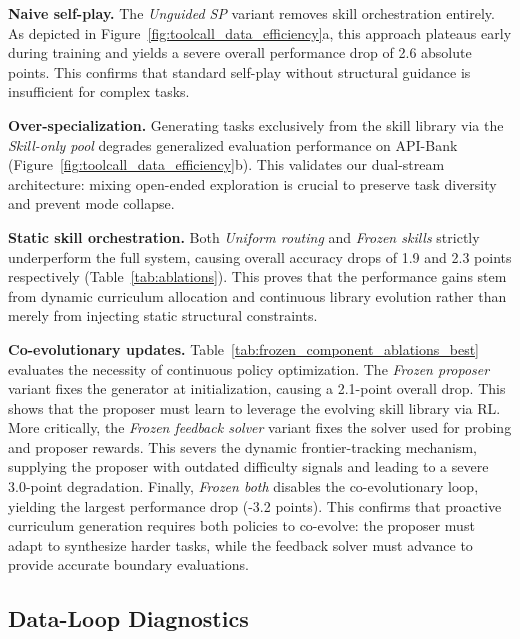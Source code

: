 \textbf{Naive self-play.} The \emph{Unguided SP} variant removes skill orchestration entirely. As depicted in Figure~\ref{fig:toolcall_data_efficiency}a, this approach plateaus early during training and yields a severe overall performance drop of 2.6 absolute points. This confirms that standard self-play without structural guidance is insufficient for complex tasks.



\textbf{Over-specialization.} Generating tasks exclusively from the skill library via the \emph{Skill-only pool} degrades generalized evaluation performance on API-Bank (Figure~\ref{fig:toolcall_data_efficiency}b). This validates our dual-stream architecture: mixing open-ended exploration is crucial to preserve task diversity and prevent mode collapse.

\textbf{Static skill orchestration.} Both \emph{Uniform routing} and \emph{Frozen skills} strictly underperform the full system, causing overall accuracy drops of 1.9 and 2.3 points respectively (Table~\ref{tab:ablations}). This proves that the performance gains stem from dynamic curriculum allocation and continuous library evolution rather than merely from injecting static structural constraints.






\textbf{Co-evolutionary updates.} Table~\ref{tab:frozen_component_ablations_best} evaluates the necessity of continuous policy optimization. The \emph{Frozen proposer} variant fixes the generator at initialization, causing a 2.1-point overall drop. This shows that the proposer must learn to leverage the evolving skill library via RL. More critically, the \emph{Frozen feedback solver} variant fixes the solver used for probing and proposer rewards. This severs the dynamic frontier-tracking mechanism, supplying the proposer with outdated difficulty signals and leading to a severe 3.0-point degradation. Finally, \emph{Frozen both} disables the co-evolutionary loop, yielding the largest performance drop (-3.2 points). This confirms that proactive curriculum generation requires both policies to co-evolve: the proposer must adapt to synthesize harder tasks, while the feedback solver must advance to provide accurate boundary evaluations.






\subsection{Data-Loop Diagnostics}
\label{sec:data_loop_diagnostics}


